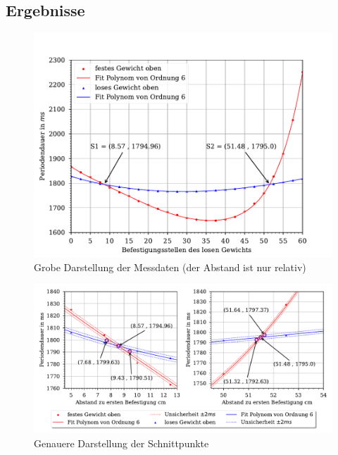 \documentclass[11pt, a4paper]{article}
\begin{document}
    \subsection{Ergebnisse}

    \begin{figure}[!h]
        \centering
        \includegraphics[width=120mm]{./Reversion_grob.pdf}

        \caption{Grobe Darstellung der Messdaten (der Abstand ist nur relativ)}
        \label{fig:revgrob}
    \end{figure}
    \begin{figure}[!h]
        \centering
        \includegraphics[width=\textwidth]{./Reversion_fein.pdf}

        \caption{Genauere Darstellung der Schnittpunkte}
        \label{fig:revfein1}
    \end{figure}
\end{document}
